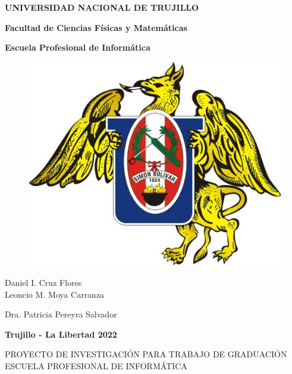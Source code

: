 \documentclass[a4paper, 12pt]{article}
\begin{document}
\begin{center}
 {\bf {\fontsize{14}{16.8}\selectfont UNIVERSIDAD NACIONAL DE TRUJILLO}}     
 
    {\bf{\fontsize{14}{16.8}\selectfont Facultad de Ciencias Físicas y Matemáticas}} 

  {\bf{\fontsize{14}{16.8}\selectfont Escuela Profesional de Informática}}
\end{center}  

\begin{figure}[ht]
\begin{center}
\includegraphics[width=.3\textwidth]{unt}
\end{center}
\end{figure}

\vskip 2cm
\begin{center}
  { \bf {\fontsize{17}{20.4}\selectfont{Desarrollo de un sistema BMS-IoT para el control automatizado del consumo eléctrico basado en el protocolo MQTT}}  } 

 
  \vskip 2cm
  { \bf {\fontsize{17}{20.4}}  }
  
 \vskip 0.25cm 
  
   Daniel I. Cruz Flores \\
   Leoncio M. Moya Carranza
 
	   
  \vskip 1cm
  { \bf {\fontsize{17}{20.4} }  } 
 \vskip 0.25cm 
 
   Dra. Patricia Pereyra Salvador
  
\vskip 4cm


{\bf {\fontsize{14}{16.8}\selectfont Trujillo - La Libertad
\vskip 0.0cm
\hspace*{-0.2cm} 
\vskip 0.1cm
2022 }}
\end{center} 
\newpage

\begin{center}
\Large {PROYECTO DE INVESTIGACIÓN PARA TRABAJO DE GRADUACIÓN \\
\vskip 0.2cm
 ESCUELA PROFESIONAL DE INFORMÁTICA}
\end{center}
\vskip 1cm
\end{document}
